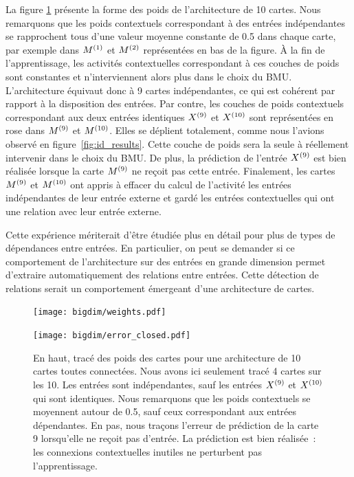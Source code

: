 \documentclass[../main]{subfiles}
\begin{document}
La figure \ref{fig:bigdim} présente la forme des poids de l'architecture de 10 cartes.
Nous remarquons que les poids contextuels correspondant à des entrées indépendantes se rapprochent tous d'une valeur moyenne constante de 0.5 dans chaque carte, par exemple dans $M^{({1})}$ et $M^{({2})}$ représentées en bas de la figure.
\`A la fin de l'apprentissage, les activités contextuelles correspondant à ces couches de poids sont constantes et n'interviennent alors plus dans le choix du BMU.
L'architecture équivaut donc à 9 cartes indépendantes, ce qui est cohérent par rapport à la disposition des entrées. 
Par contre, les couches de poids contextuels correspondant aux deux entrées identiques $X^{({9})}$ et $X^{({10})}$ sont représentées en rose dans $M^{({9})}$ et $M^{({10})}$. Elles se déplient totalement, comme nous l'avions observé en figure~\ref{fig:id_results}. Cette couche de poids sera la seule à réellement intervenir dans le choix du BMU.
De plus, la prédiction de l'entrée $X^{({9})}$ est bien réalisée lorsque la carte $M^{({9})}$ ne reçoit pas cette entrée. Finalement, les cartes $M^{({9})}$ et $M^{({10})}$ ont appris à effacer du calcul de l'activité les entrées indépendantes de leur entrée externe et gardé les entrées contextuelles qui ont une relation avec leur entrée externe.

Cette expérience mériterait d'être étudiée plus en détail pour plus de types de dépendances entre entrées. 
En particulier, on peut se demander si ce comportement de l'architecture sur des entrées en grande dimension permet d'extraire automatiquement des relations entre entrées. Cette détection de relations serait un comportement émergeant d'une architecture de cartes.

\begin{figure}[h!]
	\begin{minipage}{\textwidth}
	\texttt{[image: bigdim/weights.pdf]}
	\end{minipage}
\begin{minipage}{\textwidth}
	\centering\texttt{[image: bigdim/error\_closed.pdf]}
	\caption{En haut, tracé des poids des cartes pour une architecture de 10 cartes toutes connectées. Nous avons ici seulement tracé 4 cartes sur les 10. Les entrées sont indépendantes, sauf les entrées $X^{({9})}$ et $X^{({10})}$ qui sont identiques. Nous remarquons que les poids contextuels se moyennent autour de 0.5, sauf ceux correspondant aux entrées dépendantes. En pas, nous traçons l'erreur de prédiction de la carte 9 lorsqu'elle ne reçoit pas d'entrée. La prédiction est bien réalisée~: les connexions contextuelles inutiles ne perturbent pas l'apprentissage. \label{fig:bigdim}}
\end{minipage}
\end{figure}
\end{document}

